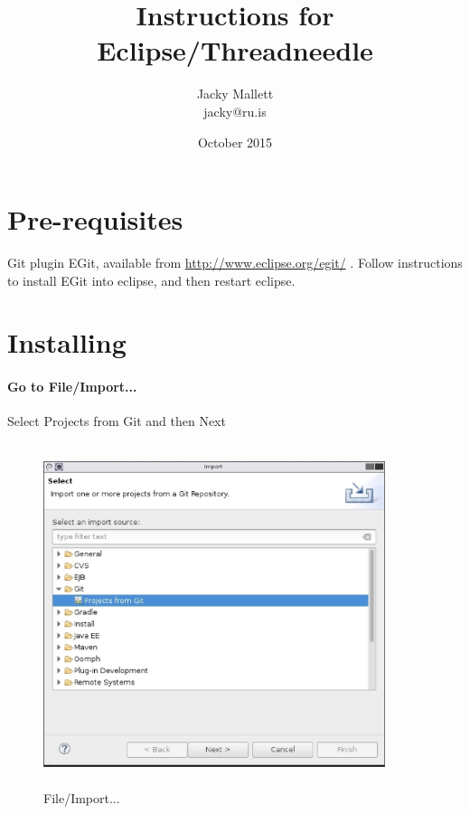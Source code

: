 \documentclass[a4latex]{article}
\begin{document}
\raggedbottom
\addtolength{\topskip}{0pt plus 10pt}
\setcounter{totalnumber}{5}
\renewcommand{\topfraction}{0.9}
\renewcommand{\textfraction}{0.1}



\title{Instructions for Eclipse/Threadneedle}
\author{Jacky Mallett  \\jacky@ru.is}
\date{October 2015} %
\maketitle
\section{Pre-requisites}
Git plugin EGit, available from \url{http://www.eclipse.org/egit/} . Follow instructions to install EGit into eclipse, and then restart eclipse.
\section{Installing}
\paragraph{ Go to File/Import...} 
\par
Select Projects from Git and then Next
\begin{figure}[ht]
\centering
\includegraphics[height=10cm,width=10cm]{images/fig_importgit.eps}
\caption{File/Import...}
\label{fig:import}
\end{figure}
\end{document}
